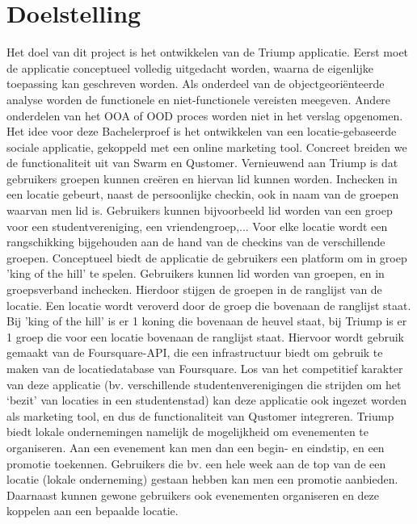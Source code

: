 
\chapter{Doelstelling}



Het doel van dit project is het ontwikkelen van de Triump applicatie. Eerst moet de applicatie conceptueel volledig uitgedacht worden, waarna de eigenlijke toepassing kan geschreven worden. Als onderdeel van de objectgeoriënteerde analyse worden de functionele en niet-functionele vereisten meegeven. Andere onderdelen van het OOA of OOD proces worden niet in het verslag opgenomen.
Het idee voor deze Bachelerproef is het ontwikkelen van een locatie-gebaseerde sociale applicatie, gekoppeld met een online marketing tool. Concreet breiden we de functionaliteit uit van Swarm en Qustomer. Vernieuwend aan Triump is dat gebruikers groepen kunnen creëren en hiervan lid kunnen worden. Inchecken in een locatie gebeurt, naast de persoonlijke checkin, ook in naam van de groepen waarvan men lid is. Gebruikers kunnen bijvoorbeeld lid worden van een groep voor een studentvereniging, een vriendengroep,...
Voor elke locatie wordt een rangschikking bijgehouden aan de hand van de checkins van de verschillende groepen. Conceptueel biedt de applicatie de gebruikers een platform om in groep 'king of the hill' te spelen. Gebruikers kunnen lid worden van groepen, en in groepsverband inchecken. Hierdoor stijgen de groepen in de ranglijst van de locatie. Een locatie wordt veroverd door de groep die bovenaan de ranglijst staat.
Bij 'king of the hill' is er 1 koning die bovenaan de heuvel staat, bij Triump is er 1 groep die voor een locatie bovenaan de ranglijst staat.
Hiervoor wordt gebruik gemaakt van de Foursquare-API, die een infrastructuur biedt om gebruik te maken van de locatiedatabase van Foursquare.
Los van het competitief karakter van deze applicatie (bv. verschillende studentenverenigingen die strijden om het ‘bezit’ van locaties in een studentenstad) kan deze applicatie ook ingezet worden als marketing tool, en dus de functionaliteit van Qustomer integreren.
Triump biedt lokale ondernemingen namelijk de mogelijkheid om evenementen te organiseren. Aan een evenement kan men dan een begin- en eindstip, en een promotie toekennen. Gebruikers die bv. een hele week aan de top van de een locatie (lokale onderneming) gestaan hebben kan men een promotie aanbieden. Daarnaast kunnen gewone gebruikers ook evenementen organiseren en deze koppelen aan een bepaalde locatie.
